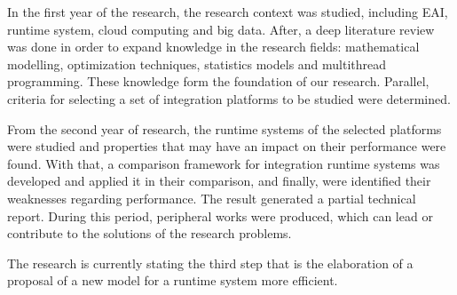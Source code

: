 In the first year of the research, the research context was studied, including EAI, runtime system, cloud computing and big data. After, a deep literature review was done in order to expand knowledge in the research fields: mathematical modelling, optimization techniques, statistics models and multithread programming. These knowledge form the foundation of our research.
Parallel, criteria for selecting a set of integration platforms to be studied were determined.

From the second year of research, the runtime systems of the selected platforms were studied and properties that may have an impact on their performance were found. With that, a comparison framework for integration runtime systems was developed and applied it in their comparison, and finally, were identified their weaknesses regarding performance. The result generated a partial technical report. During this period, peripheral works were produced, which can lead or contribute to the solutions of the research problems.

The research is currently stating the third step that is the elaboration of a proposal of a new model for a runtime system more efficient.
